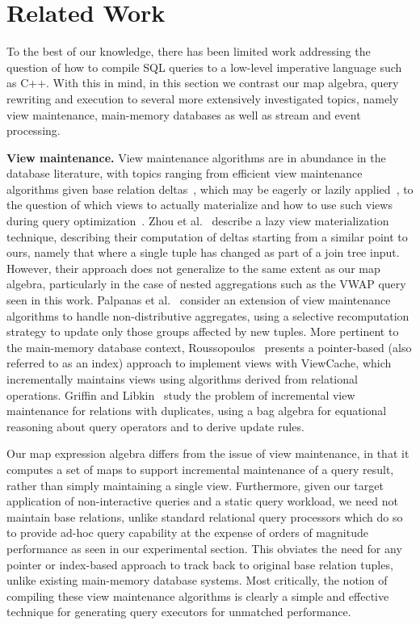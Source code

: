 \section{Related Work}

To the best of our knowledge, there has been limited work addressing the question
of how to compile SQL queries to a low-level imperative language such as C++.
With this in mind, in this section we contrast our map algebra, query rewriting
and execution to several more extensively investigated topics, namely view
maintenance, main-memory databases as well as stream and event processing.

\textbf{View maintenance.}
View maintenance algorithms are in abundance in the database literature, with
topics ranging from efficient view maintenance algorithms given base relation
deltas~\cite{colby-sigmod:96}, which may be eagerly or lazily
applied~\cite{yan-vldb:95,zhou-vldb:07}, to the question of which views to
actually materialize and how to use such views during query
optimization~\cite{kotidis-tods:01,zhou-icde:07}. Zhou et al.~\cite{zhou-vldb:07}
describe a lazy view materialization technique, describing their computation of
deltas starting from a similar point to ours, namely that where a single tuple
has changed as part of a join tree input. However, their approach does not
generalize to the same extent as our map algebra, particularly in the case of
nested aggregations such as the VWAP query seen in this work. Palpanas et
al.~\cite{palpanas-vldb:02} consider an extension of view maintenance algorithms
to handle non-distributive aggregates, using a selective recomputation strategy
to update only those groups affected by new tuples. More pertinent to the
main-memory database context, Roussopoulos~\cite{roussopoulos-tods:91} presents a
pointer-based (also referred to as an index) approach to implement views with
ViewCache, which incrementally maintains views using algorithms derived from
relational operations. Griffin and Libkin~\cite{griffin-sigmod:95} study the
problem of incremental view maintenance for relations with duplicates, using a
bag algebra for equational reasoning about query operators and to derive update
rules.

Our map expression algebra differs from the issue of view maintenance, in that it
computes a set of maps to support incremental maintenance of a query result,
rather than simply maintaining a single view.
Furthermore, given our target application of non-interactive queries and a static
query workload, we need not maintain base relations, unlike standard relational
query processors which do so to provide ad-hoc query capability at the expense of
orders of magnitude performance as seen in our experimental section. This
obviates the need for any pointer or index-based approach to track back to
original base relation tuples, unlike existing main-memory database systems. Most
critically, the notion of compiling these view maintenance algorithms is clearly
a simple and effective technique for generating query executors for unmatched
performance.

